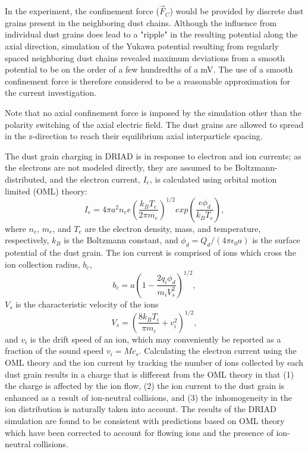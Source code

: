 \documentclass[aip,amsmath,amssymb,graphicx,floatfix,reprint]{revtex4-1}
\begin{document}
In the experiment, the confinement force ($\vec{F}_C$) would be provided by discrete dust grains present in the neighboring dust chains.  Although the influence from individual dust grains does lead to a "ripple" in the resulting potential along the axial direction, simulation of the Yukawa potential resulting from regularly spaced neighboring dust chains revealed maximum deviations from a smooth potential to be on the order of a few hundredths of a mV.  The use of a smooth confinement force is therefore considered to be a reasonable approximation for the current investigation.

Note that no axial confinement force is imposed by the simulation other than the polarity switching of the axial electric field.  The dust grains are allowed to spread in the z-direction to reach their equilibrium axial interparticle spacing.

The dust grain charging in DRIAD is in response to electron and ion currents; as the electrons are not modeled directly, they are assumed to be Boltzmann-distributed, and the electron current, $I_e$, is calculated using orbital motion limited (OML) theory: \begin{equation} I_e = 4\pi a^2 n_e e\left(\frac{k_B T_e}{2\pi m_e}\right)^{1/2}exp\left(\frac{e\phi_d}{k_B T_e}\right),\label{eq:electroncurrent}\end{equation} where $n_e$, $m_e$, and $T_e$ are the electron density, mass, and temperature, respectively, $k_B$ is the Boltzmann constant, and $\phi_d = Q_d/(4\pi \epsilon_0 a)$ is the surface potential of the dust grain.  The ion current is comprised of ions which cross the ion collection radius, $b_c$, \begin{equation} b_c = a\left(1-\frac{2q_i\phi_d}{m_i V_s^2}\right)^{1/2}, \label{eq:ioncollradius}\end{equation}  $V_s$ is the characteristic velocity of the ions \begin{equation} V_s = \left( \frac{8k_B T_i}{\pi m_i}+ v_i^2\right)^{1/2},\label{eq:ionvelocity}\end{equation} and $v_i$ is the drift speed of an ion, which may conveniently be reported as a fraction of the sound speed $v_i = M c_s$.  Calculating the electron current using the OML theory and the ion current by tracking the number of ions collected by each dust grain results in a charge that is different from the OML theory in that (1) the charge is affected by the ion flow, (2) the ion current to the dust grain is enhanced as a result of ion-neutral collisions, and (3) the inhomogeneity in the ion distribution is naturally taken into account.  The results of the DRIAD simulation are found to be consistent with predictions based on OML theory which have been corrected to account for flowing ions and the presence of ion-neutral collisions\cite{Matthews2021}.
\end{document}
